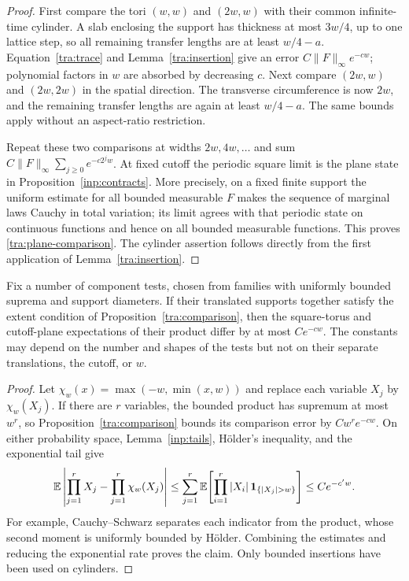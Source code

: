\begin{proof}
First compare the tori $(w,w)$ and $(2w,w)$ with their common
infinite-time cylinder.  A slab enclosing the support has thickness
at most $3w/4$, up to one lattice step, so all remaining transfer
lengths are at least $w/4-a$.  Equation~\eqref{tra:trace} and
Lemma~\ref{tra:insertion} give an error
$C\|F\|_\infty e^{-cw}$; polynomial factors in $w$ are absorbed by
decreasing $c$.  Next compare $(2w,w)$ and $(2w,2w)$ in the spatial
direction.  The transverse circumference is now $2w$, and the
remaining transfer lengths are again at least $w/4-a$.  The same
bounds apply without an aspect-ratio restriction.

Repeat these two comparisons at widths $2w,4w,\ldots$ and sum
$C\|F\|_\infty\sum_{j\ge0}e^{-c2^jw}$.
At fixed cutoff the periodic square limit is the plane state in
Proposition~\ref{inp:contracts}.  More precisely, on a fixed finite
support the uniform estimate for all bounded measurable $F$ makes
the sequence of marginal laws Cauchy in total variation; its limit
agrees with that periodic state on continuous functions and hence on
all bounded measurable functions.  This proves
\eqref{tra:plane-comparison}.  The cylinder assertion follows
directly from the first application of Lemma~\ref{tra:insertion}.
\end{proof}

\begin{corollary}
\label{tra:moments}
Fix a number of component tests, chosen from families with uniformly
bounded suprema and support diameters.  If their translated supports
together satisfy the extent condition of
Proposition~\ref{tra:comparison}, then the square-torus and cutoff-plane
expectations of their product differ by at most $Ce^{-cw}$.
The constants may depend on the number and shapes of the tests but
not on their separate translations, the cutoff, or $w$.
\end{corollary}

\begin{proof}
Let $\chi_w(x)=\max(-w,\min(x,w))$ and replace each variable $X_j$
by $\chi_w(X_j)$.  If there are $r$ variables, the bounded product
has supremum at most $w^r$, so Proposition~\ref{tra:comparison}
bounds its comparison error by $Cw^re^{-cw}$.
On either probability space, Lemma~\ref{inp:tails}, H\"older's
inequality, and the exponential tail give
\[
 \E\left|\prod_{j=1}^r X_j-
               \prod_{j=1}^r\chi_w(X_j)\right|
 \le \sum_{j=1}^r
   \E\!\left[\prod_{i=1}^r|X_i|\,\one_{\{|X_j|>w\}}\right]
 \le Ce^{-c'w}.
\]
For example, Cauchy--Schwarz separates each indicator from the
product, whose second moment is uniformly bounded by H\"older.
Combining the estimates and reducing the exponential rate proves
the claim.  Only bounded insertions have been used on cylinders.
\end{proof}
